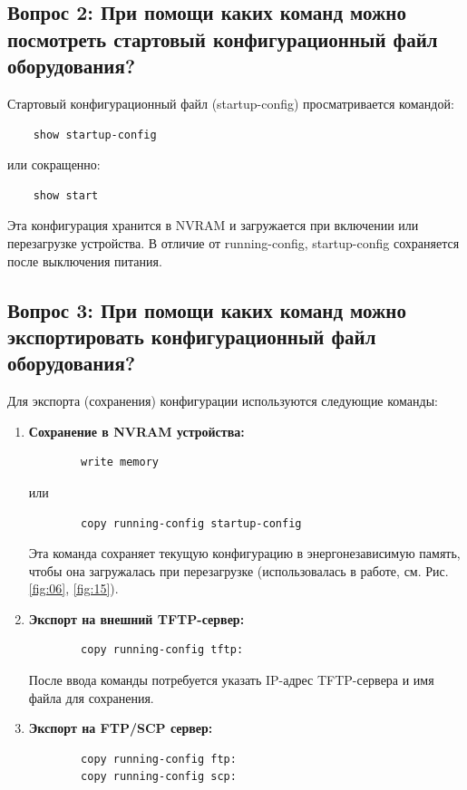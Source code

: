 \subsection{Вопрос 2: При помощи каких команд можно посмотреть стартовый конфигурационный файл оборудования?}
Стартовый конфигурационный файл (startup-config) просматривается командой:
\begin{verbatim}
    show startup-config
\end{verbatim}
или сокращенно:
\begin{verbatim}
    show start
\end{verbatim}
Эта конфигурация хранится в NVRAM и загружается при включении или перезагрузке устройства. В отличие от running-config, startup-config сохраняется после выключения питания.

\subsection{Вопрос 3: При помощи каких команд можно экспортировать конфигурационный файл оборудования?}
Для экспорта (сохранения) конфигурации используются следующие команды:

\begin{enumerate}
    \item \textbf{Сохранение в NVRAM устройства:}
    \begin{verbatim}
        write memory
    \end{verbatim}
    или
    \begin{verbatim}
        copy running-config startup-config
    \end{verbatim}
    Эта команда сохраняет текущую конфигурацию в энергонезависимую память, чтобы она загружалась при перезагрузке (использовалась в работе, см. Рис. \ref{fig:06}, \ref{fig:15}).
    
    \item \textbf{Экспорт на внешний TFTP-сервер:}
    \begin{verbatim}
        copy running-config tftp:
    \end{verbatim}
    После ввода команды потребуется указать IP-адрес TFTP-сервера и имя файла для сохранения.
    
    \item \textbf{Экспорт на FTP/SCP сервер:}
    \begin{verbatim}
        copy running-config ftp:
        copy running-config scp:
    \end{verbatim}
\end{enumerate}

